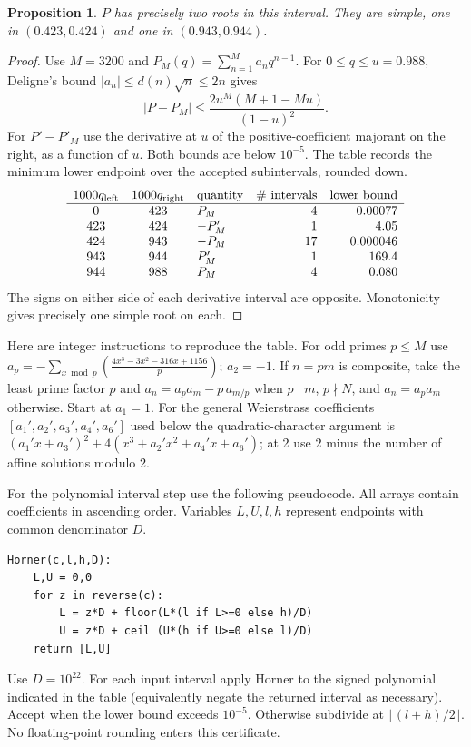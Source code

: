\documentclass[11pt]{article}
\newtheorem{proposition}[theorem]{Proposition}
\begin{document}
\begin{proposition}\label{hyp:sign}
$P$ has precisely two roots in this interval. They are simple, one
in $(0.423,0.424)$ and one in $(0.943,0.944)$.
\end{proposition}
\begin{proof}
Use $M=3200$ and $P_M(q)=\sum_{n=1}^{M}a_nq^{n-1}$.
For $0\le q\le u=0.988$, Deligne's bound $|a_n|\le d(n)\sqrt n\le2n$
gives
\[
 |P-P_M|\le \frac{2u^M(M+1-Mu)}{(1-u)^2}.
\]
For $P'-P'_M$ use the derivative at $u$ of the positive-coefficient
majorant on the right, as a function of $u$. Both bounds are below
$10^{-5}$. The table records the minimum lower endpoint over the
accepted subintervals, rounded down.
\[
\begin{array}{cclrr}
1000q_{\rm left}&1000q_{\rm right}&\text{quantity}&
\#\text{ intervals}&\text{lower bound}\\ \hline
0&423&P_M&4&0.00077\\
423&424&-P'_M&1&4.05\\
424&943&-P_M&17&0.000046\\
943&944&P'_M&1&169.4\\
944&988&P_M&4&0.080
\end{array}
\]
The signs on either side of each derivative interval are opposite.
Monotonicity gives precisely one simple root on each.
\end{proof}

Here are integer instructions to reproduce the table. For odd primes
$p\le M$ use $a_p=-\sum_{x\bmod p}(\frac{4x^3-3x^2-316x+1156}{p})$;
$a_2=-1$. If $n=pm$ is composite, take the least prime factor $p$ and
$a_n=a_pa_m-p\,a_{m/p}$ when $p\mid m$, $p\nmid N$, and $a_n=a_pa_m$
otherwise. Start at $a_1=1$. For the general Weierstrass coefficients
$[a_1',a_2',a_3',a_4',a_6']$ used below the quadratic-character argument
is $(a_1'x+a_3')^2+4(x^3+a_2'x^2+a_4'x+a_6')$; at 2 use $2$ minus the
number of affine solutions modulo 2.

For the polynomial interval step use the following pseudocode.
All arrays contain coefficients in ascending order. Variables $L,U,l,h$
represent endpoints with common denominator $D$.
\begin{verbatim}
Horner(c,l,h,D):
    L,U = 0,0
    for z in reverse(c):
        L = z*D + floor(L*(l if L>=0 else h)/D)
        U = z*D + ceil (U*(h if U>=0 else l)/D)
    return [L,U]
\end{verbatim}
Use $D=10^{22}$. For each input interval apply Horner to the signed
polynomial indicated in the table (equivalently negate the returned
interval as necessary). Accept when the lower bound exceeds $10^{-5}$.
Otherwise subdivide at $\lfloor(l+h)/2\rfloor$. No floating-point
rounding enters this certificate.
\end{document}
